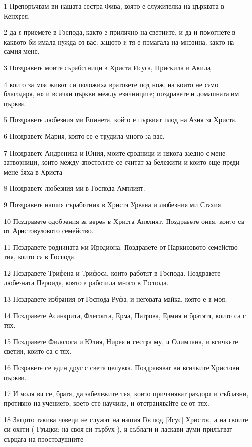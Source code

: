 \par 1 Препоръчвам ви нашата сестра Фива, която е служителка на църквата в Кенхрея,
\par 2 да я приемете в Господа, както е прилично на светиите, и да и помогнете в каквото би имала нужда от вас; защото и тя е помагала на мнозина, както на самия мене.
\par 3 Поздравете моите съработници в Христа Исуса, Прискила и Акила,
\par 4 които за моя живот си положиха вратовете под нож, на които не само благодаря, но и всички църкви между езичниците; поздравете и домашната им църква.
\par 5 Поздравете любезния ми Епинета, който е първият плод на Азия за Христа.
\par 6 Поздравете Мария, която се е трудила много за вас.
\par 7 Поздравете Андроника и Юния, моите сродници и някога заедно с мене затворници, които между апостолите се считат за бележити и които още преди мене бяха в Христа.
\par 8 Поздравете любезния ми в Господа Амплият.
\par 9 Поздравете нашия съработник в Христа Урвана и любезния ми Стахия.
\par 10 Поздравете одобрения за верен в Христа Апелият. Поздравете ония, които са от Аристовуловото семейство.
\par 11 Поздравете роднината ми Иродиона. Поздравете от Наркисовото семейство тия, които са в Господа.
\par 12 Поздравете Трифена и Трифоса, които работят в Господа. Поздравете любезната Пероида, която е работила много в Господа.
\par 13 Поздравете избрания от Господа Руфа, и неговата майка, която е и моя.
\par 14 Поздравете Асинкрита, Флегоита, Ерма, Патрова, Ермия и братята, които са с тях.
\par 15 Поздравете Филолога и Юлия, Нирея и сестра му, и Олимпана, и всичките светии, които са с тях.
\par 16 Позравете се един друг с света целувка. Поздравяват ви всичките Христови църкви.
\par 17 И моля ви се, братя, да забележите тия, които причиняват раздори и съблазни, противно на учението, което сте научили, и отстранявайте се от тях.
\par 18 Защото такива човеци не служат на нашия Господ [Исус] Христос, а на своите си охоти ( Гръцки: на своя си търбух ), и съблаги и ласкави думи прилъгват сърцата на простодушните.
